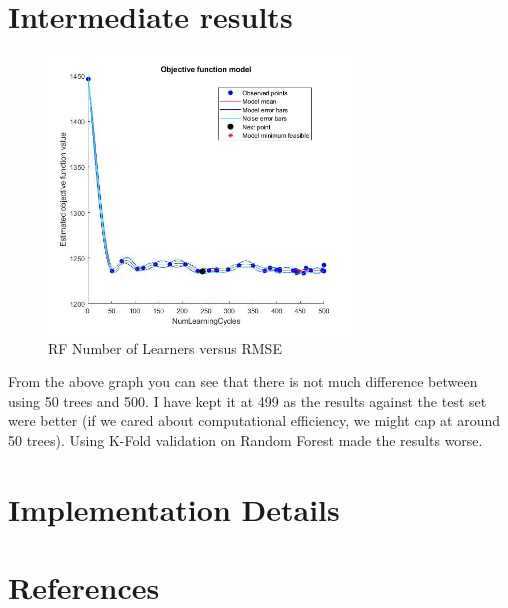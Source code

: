 \documentclass[a4paper,12pt]{article}
\begin{document}
\section{Intermediate results}

\begin{figure}[!htb] %
\centering
\includegraphics[height=7.38cm]{img/RFNumLearCyclesVMinMRSE}
\caption{RF Number of Learners versus RMSE}
\end{figure}

From the above graph you can see that there is not much difference between using 50 trees and 500. I have kept it at 499 as the results against the test set were better (if we cared about computational efficiency, we might cap at around 50 trees).
Using K-Fold validation on Random Forest made the results worse.

\section{Implementation Details}

\section{References}


\end{document}
